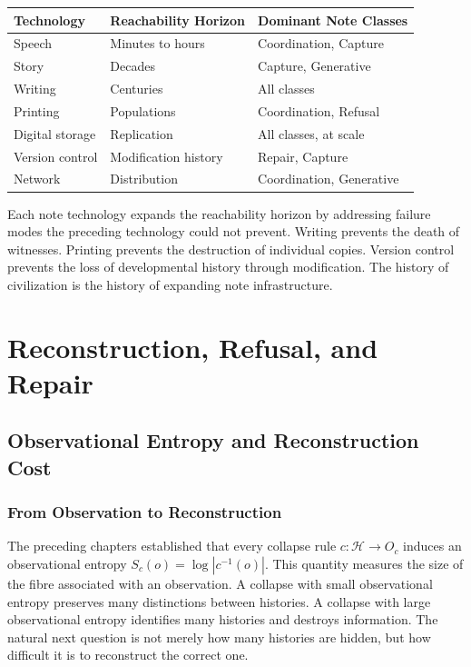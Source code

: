 \documentclass[12pt, a4paper, openany]{book}
\theoremstyle{plain}
\theoremstyle{definition}
\theoremstyle{remark}
\newcommand{\calH}{\mathcal{H}}
\begin{document}
\begin{center}
\begin{tabular}{lll}
\toprule
Technology & Reachability Horizon & Dominant Note Classes \\
\midrule
Speech & Minutes to hours & Coordination, Capture \\
Story & Decades & Capture, Generative \\
Writing & Centuries & All classes \\
Printing & Populations & Coordination, Refusal \\
Digital storage & Replication & All classes, at scale \\
Version control & Modification history & Repair, Capture \\
Network & Distribution & Coordination, Generative \\
\bottomrule
\end{tabular}
\end{center}

Each note technology expands the reachability horizon by addressing failure modes
the preceding technology could not prevent. Writing prevents the death of
witnesses. Printing prevents the destruction of individual copies. Version control
prevents the loss of developmental history through modification. The history of
civilization is the history of expanding note infrastructure.


\part{Reconstruction, Refusal, and Repair}

\chapter{Observational Entropy and Reconstruction Cost}

\section{From Observation to Reconstruction}

The preceding chapters established that every collapse rule
$c : \calH \to O_c$ induces an observational entropy
$S_c(o) = \log |c^{-1}(o)|$.
This quantity measures the size of the fibre associated with an
observation. A collapse with small observational entropy preserves many
distinctions between histories. A collapse with large observational entropy
identifies many histories and destroys information. The natural next question is
not merely how many histories are hidden, but how difficult it is to reconstruct
the correct one.
\end{document}
